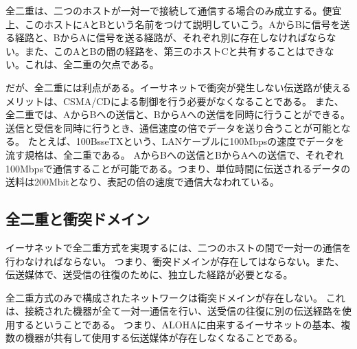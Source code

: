 全二重は、二つのホストが一対一で接続して通信する場合のみ成立する。便宜上、このホストにAとBという名前をつけて説明していこう。AからBに信号を送る経路と、BからAに信号を送る経路が、それぞれ別に存在しなければならない。また、このAとBの間の経路を、第三のホストCと共有することはできない。これは、全二重の欠点である。

だが、全二重には利点がある。イーサネットで衝突が発生しない伝送路が使えるメリットは、CSMA/CDによる制御を行う必要がなくなることである。
また、全二重では、AからBへの送信と、BからAへの送信を同時に行うことができる。送信と受信を同時に行うとき、通信速度の倍でデータを送り合うことが可能となる。
たとえば、100BsseTXという、LANケーブルに100Mbpsの速度でデータを流す規格は、全二重である。
AからBへの送信とBからAへの送信で、それぞれ100Mbpsで通信することが可能である。つまり、単位時間に伝送されるデータの送料は200Mbitとなり、表記の倍の速度で通信大なわれている。

\subsection{全二重と衝突ドメイン}

イーサネットで全二重方式を実現するには、二つのホストの間で一対一の通信を行わなければならない。
つまり、衝突ドメインが存在してはならない。また、伝送媒体で、送受信の往復のために、独立した経路が必要となる。

全二重方式のみで構成されたネットワークは衝突ドメインが存在しない。
これは、接続された機器が全て一対一通信を行い、送受信の往復に別の伝送経路を使用するということである。
つまり、ALOHAに由来するイーサネットの基本、複数の機器が共有して使用する伝送媒体が存在しなくなることである。



